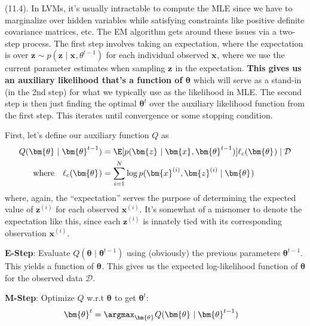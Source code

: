 \documentclass[11pt]{article}
\renewcommand\vec[2][]{\bm{#2}_{#1}}
\newcommand\myspace[1][]{\vspace{#1\bigskipamount}}
\newcommand\p{\Needspace{10\baselineskip} \noindent}
\begin{document}
\myspace
\p {} (11.4). In LVMs, it's usually intractable to compute the MLE since we have to marginalize over hidden variables while satisfying constraints like positive definite covariance matrices, etc. The EM algorithm gets around these issues via a two-step process. The first step involves taking an expectation, where the expectation is over $\vec z \sim p(\vec z \mid \vec x, \theta^{t-1})$ for each individual observed $\vec x$, where we use the current parameter estimates when sampling $\vec z$ in the expectation. \textbf{This gives us an auxiliary likelihood that's a function of $\vec\theta$} which will serve as a stand-in (in the 2nd step) for what we typically use as the likelihood in MLE. The second step is then just finding the optimal $\vec{\theta}^t$ over the auxiliary likelihood function from the first step. This iterates until convergence or some stopping condition.

\begin{algorithm}

First, let's define our auxiliary function $Q$ as
	\begin{align}
		Q(\vec\theta \mid \vec{\theta}^{t-1})
			&= \E[p(\vec z \mid \vec x, \vec{\theta}^{t-1})]{\ell_c(\vec\theta) \mid \mathcal{D}} \\
		\text{where}\quad
		\ell_c(\vec\theta)
			&= \sum_{i=1}^{N} \log p(\vec{x}^{(i)}, \vec{z}^{(i)} \mid \vec\theta)
	\end{align}
	where, again, the ``expectation'' serves the purpose of determining the expected value of $\vec{z}^{(i)}$ for each observed $\vec{x}^{(i)}$. It's somewhat of a misnomer to denote the expectation like this, since each $\vec{z}^{(i)}$ is innately tied with its corresponding observation $\vec{x}^{(i)}$.
	
	\begin{compactenum}
		\item \textbf{E-Step}: Evaluate $Q(\vec\theta \mid \vec{\theta}^{t-1})$ using (obviously) the previous parameters $\vec{\theta}^{t-1}$. This yields a function of $\vec\theta$. This gives us the expected log-likelihood function of $\vec\theta$ for the observed data $\mathcal D$. 
		
		\item \textbf{M-Step}: Optimize $Q$ w.r.t $\vec\theta$ to get $\vec{\theta}^t$:
		\begin{align}
			\vec{\theta}^t 
				&= \argmax_{\vec\theta} Q(\vec\theta \mid \vec{\theta}^{t-1})
		\end{align}
	\end{compactenum}

\end{algorithm}
\end{document}
